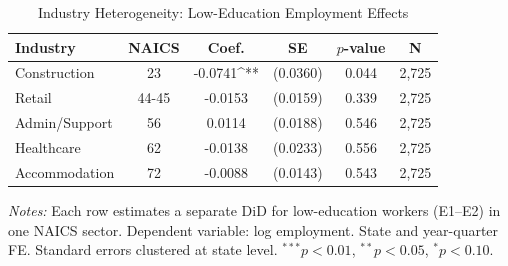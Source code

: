 \begin{table}[htbp]
\centering
\caption{Industry Heterogeneity: Low-Education Employment Effects}
\label{tab:industry}
\begin{tabular}{lccccc}
\toprule
Industry & NAICS & Coef. & SE & $p$-value & N \\
\midrule
Construction & 23 & -0.0741^{**} & (0.0360) & 0.044 & 2,725 \\
Retail & 44-45 & -0.0153 & (0.0159) & 0.339 & 2,725 \\
Admin/Support & 56 & 0.0114 & (0.0188) & 0.546 & 2,725 \\
Healthcare & 62 & -0.0138 & (0.0233) & 0.556 & 2,725 \\
Accommodation & 72 & -0.0088 & (0.0143) & 0.543 & 2,725 \\
\bottomrule
\end{tabular}
\par\vspace{0.3em}
{\footnotesize \textit{Notes:} Each row estimates a separate DiD for low-education workers (E1--E2) in one NAICS sector. Dependent variable: log employment. State and year-quarter FE. Standard errors clustered at state level. $^{***}p<0.01$, $^{**}p<0.05$, $^{*}p<0.10$.}
\end{table}
